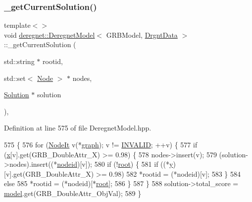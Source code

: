 \subsubsection{\texorpdfstring{\+\_\+get\+Current\+Solution()}{\_getCurrentSolution()}\hspace{0.1cm}{\footnotesize\ttfamily [2/3]}}
{\footnotesize\ttfamily template$<$$>$ \\
void \hyperlink{classderegnet_1_1DeregnetModel}{deregnet\+::\+Deregnet\+Model}$<$ G\+R\+B\+Model, \hyperlink{classderegnet_1_1DrgntData}{Drgnt\+Data} $>$\+::\+\_\+get\+Current\+Solution (\begin{DoxyParamCaption}\item[{std\+::string $\ast$}]{rootid,  }\item[{std\+::set$<$ \hyperlink{namespacederegnet_a744bad34f2de9856d36715a445f027f3}{Node} $>$ $\ast$}]{nodes,  }\item[{\hyperlink{structderegnet_1_1Solution}{Solution} $\ast$}]{solution }\end{DoxyParamCaption})\hspace{0.3cm}{\ttfamily [inline]}, {\ttfamily [private]}}



Definition at line 575 of file Deregnet\+Model.\+hpp.


\begin{DoxyCode}
575                                                                                                            
                  \{
576     \textcolor{keywordflow}{for} (\hyperlink{namespacederegnet_ac34314e1b5f456fc6d1bb9d96316de4a}{NodeIt} v(*\hyperlink{classderegnet_1_1DeregnetModel_a3cd2f54b8e061ef5bed32708d9bc1ef1}{graph}); v != \hyperlink{usinglemon_8hpp_adf770fe2eec438e3758ffe905dbae208}{INVALID}; ++v) \{
577         \textcolor{keywordflow}{if} (\hyperlink{classderegnet_1_1DeregnetModel_a360c980f3fec4dfbab50e9bb06a933a8}{x}[v].\textcolor{keyword}{get}(GRB\_DoubleAttr\_X) >= 0.98) \{
578             nodes->insert(v);
579             (solution->nodes).insert((*\hyperlink{classderegnet_1_1DeregnetModel_adfebf6f9983c9ccc934469a79381fb78}{nodeid})[v]);
580             \textcolor{keywordflow}{if} (!\hyperlink{classderegnet_1_1DeregnetModel_a54b20393a0e26d65935d387685d7fe96}{root}) \{
581                 \textcolor{keywordflow}{if} ((*\hyperlink{classderegnet_1_1DeregnetModel_ae76df61afe302b939165facf3dd21ac8}{y})[v].get(GRB\_DoubleAttr\_X) >= 0.98)
582                     *rootid = (*nodeid)[v];
583             \}
584             \textcolor{keywordflow}{else}
585                 *rootid = (*nodeid)[*\hyperlink{classderegnet_1_1DeregnetModel_a54b20393a0e26d65935d387685d7fe96}{root}];
586         \}
587     \}
588     solution->total\_score = \hyperlink{classderegnet_1_1DeregnetModel_a30d525de2086e342b33fe3e45ede4947}{model}.get(GRB\_DoubleAttr\_ObjVal);
589 \}
\end{DoxyCode}
\mbox{\label{classderegnet_1_1DeregnetModel_a38d98fe20d193181c7c5d0655f3c0808}} 
